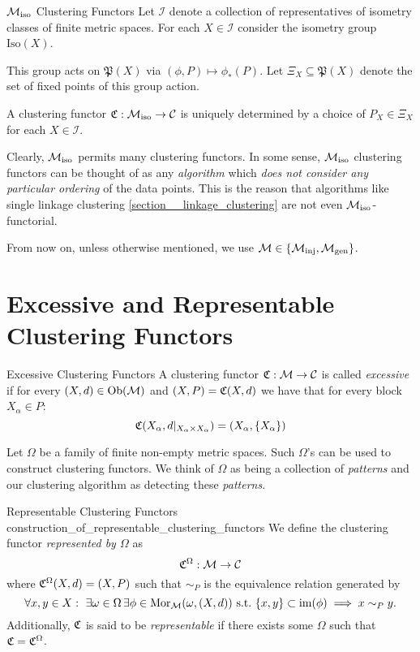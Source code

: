 \begin{myremark}{${\mathcal{M}_\mathrm{iso}}$ Clustering Functors \cite[Thm.~6.1]{Carlsson2010}}{}
Let $\mathcal{I}$ denote a collection of representatives of isometry classes of finite metric spaces.
For each $X \in \mathcal{I}$ consider the isometry group $\mathrm{Iso}(X)$. \par

\medskip This group acts on $\mathfrak{P}(X)$ via $(\phi, P) \mapsto \phi_*(P)$.
Let $\Xi_X \subseteq \mathfrak{P}(X)$ denote the set of fixed points of this group action. \par

\medskip A clustering functor $\mathfrak{C}: {\mathcal{M}_\mathrm{iso}} \to \mathcal{C}$ is uniquely determined by a choice of $P_X \in \Xi_X$ for each $X \in \mathcal{I}$.
\end{myremark}

Clearly, ${\mathcal{M}_\mathrm{iso}}$ permits many clustering functors.
In some sense, ${\mathcal{M}_\mathrm{iso}}$ clustering functors can be thought of as any \emph{algorithm} which \emph{does not consider any particular ordering} of the data points.
This is the reason that algorithms like single linkage clustering \ref{section__linkage_clustering} are not even ${\mathcal{M}_\mathrm{iso}}$-functorial.

From now on, unless otherwise mentioned, we use $\mathcal{M} \in \{{\mathcal{M}_\mathrm{inj}}, {\mathcal{M}_\mathrm{gen}}\}$.

\section{Excessive and Representable Clustering Functors}

\begin{definition}{Excessive Clustering Functors \cite[Def.~6.2]{Carlsson2010}}{}
A clustering functor $\mathfrak{C}: \mathcal{M} \to \mathcal{C}$ is called \emph{excessive} if for every $(X,d) \in \mathrm {Ob}(\mathcal{M})$ and $(X,P) = \mathfrak{C}(X,d)$ we have that for every block $X_\alpha \in P$:
$$
\mathfrak{C}(X_\alpha, d|_{X_\alpha \times X_\alpha}) = (X_\alpha, \{X_\alpha\})
$$
\end{definition}

Let $\Omega$ be a family of finite non-empty metric spaces. Such $\Omega$'s can be used to construct clustering functors. We think of $\Omega$ as being a collection of \emph{patterns} and our clustering algorithm as detecting these \emph{patterns}.

\begin{definition}{Representable Clustering Functors \cite[Sec.~6.2]{Carlsson2010}}{construction_of_representable_clustering_functors}
We define the clustering functor \emph{represented by $\Omega$} as
$$
\mathfrak{C}^\Omega: \mathcal{M} \to \mathcal{C}
$$
where $\mathfrak{C}^\Omega(X,d) = (X, P)$ such that $\sim_P$ 
is the equivalence relation generated by
\begin{equation*}
    \forall x,y \in X: \ \exists \omega \in \Omega \,\exists \phi \in \mathrm {Mor}_{\mathcal{M}}(\omega, (X,d)) \ \text{s.t.} \ \{x,y\} \subset \operatorname*{im}(\phi) \implies x \sim_P y.
\end{equation*}
Additionally, $\mathfrak{C}$ is said to be \emph{representable} if there exists some $\Omega$ such that $\mathfrak{C} = \mathfrak{C}^\Omega$.
\end{definition}


